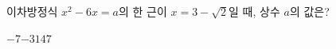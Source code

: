 이차방정식 $x^2-6x=a$의 한 근이 $x=3-\sqrt{2}$일 때, 상수 $a$의 값은?
\begin{choices32}{$-7$}{$-3$}{$1$}{$4$}{$7$}\end{choices32}
